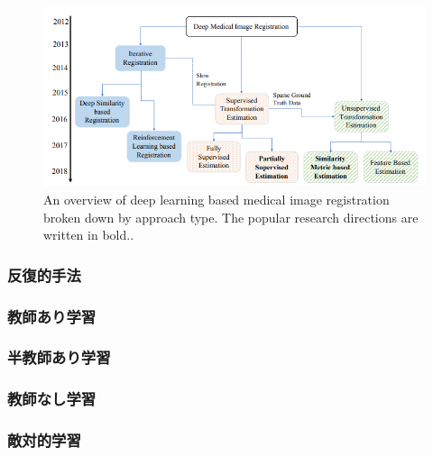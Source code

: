     \begin{figure}[ht]
      \centering
      \includegraphics[width=14cm]{1_intro/img/classification_of_method.png}
      \caption{An overview of deep learning based medical image registration broken down by approach type. The popular research directions are written in bold.\cite{haskins2020deep}.}
    \end{figure}
    
    \subsubsection{反復的手法}
    
    \subsubsection{教師あり学習}
    
    \subsubsection{半教師あり学習}
    
    \subsubsection{教師なし学習}
    
    \subsubsection{敵対的学習}
